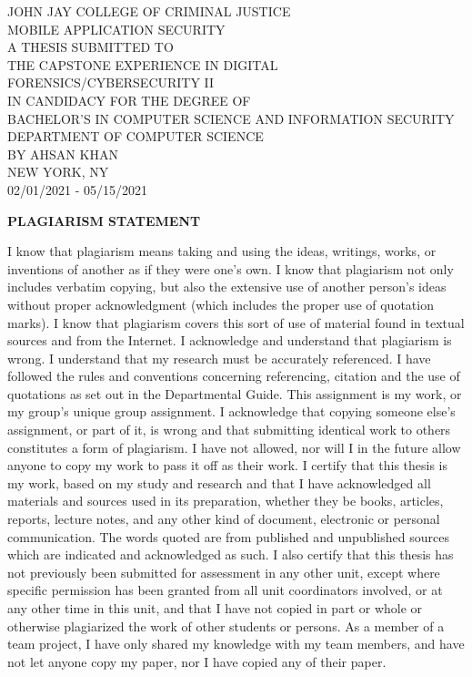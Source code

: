 \documentclass{article}
\begin{document}
\begin{center}
  \large{JOHN JAY COLLEGE OF CRIMINAL JUSTICE}  \\
  \vspace{15mm}
  \large{MOBILE APPLICATION SECURITY}\\
  \vspace{15mm}
  \large{A THESIS SUBMITTED TO\\ THE CAPSTONE EXPERIENCE IN DIGITAL FORENSICS/CYBERSECURITY II}\\
  \large{IN CANDIDACY FOR THE DEGREE OF\\
BACHELOR’S IN COMPUTER SCIENCE AND INFORMATION SECURITY}\\
  \vspace{7mm}
  \large{DEPARTMENT OF COMPUTER SCIENCE}\\
  \vspace{15mm}
  \large{BY AHSAN KHAN}\\
   \vspace{15mm}
  \large{NEW YORK, NY}\\
  \large{02/01/2021 - 05/15/2021}
  \vspace{100mm}
\end{center}
\begin{center}
    \textbf{PLAGIARISM STATEMENT}
\end{center}
I know that plagiarism means taking and using the ideas, writings, works, or inventions of another as if they were one’s own. I know that plagiarism not only includes verbatim copying, but also the extensive use of another person’s ideas without proper acknowledgment (which includes the proper use of quotation marks). I know that plagiarism covers this sort of use of material found in textual sources and from the Internet. I acknowledge and understand that plagiarism is wrong. I understand that my research must be accurately referenced. I have followed the rules and conventions concerning referencing, citation and the use of quotations as set out in the Departmental Guide. This assignment is my work, or my group’s unique group assignment. I acknowledge that copying someone else’s assignment, or part of it, is wrong and that submitting identical work to others constitutes a form of plagiarism. I have not allowed, nor will I in the future allow anyone to copy my work to pass it off as their work. I certify that this thesis is my work, based on my study and research and that I have acknowledged all materials and sources used in its preparation, whether they be books, articles, reports, lecture notes, and any other kind of document, electronic or personal communication. The words quoted are from published and unpublished sources which are indicated and acknowledged as such. I also certify that this thesis has not previously been submitted for assessment in any other unit, except where specific permission has been granted from all unit coordinators involved, or at any other time in this unit, and that I have not copied in part or whole or otherwise plagiarized the work of other students or persons. As a member of a team project, I have only shared my knowledge with my team members, and have not let anyone copy my paper, nor I have copied any of their paper.\\
\end{document}
